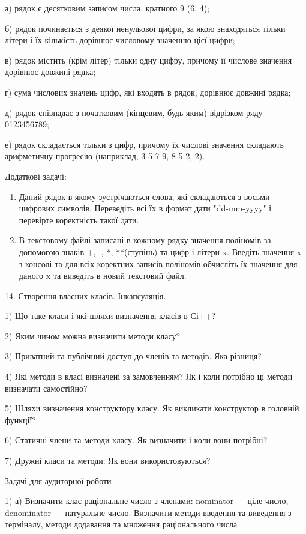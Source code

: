 \documentclass[]{article}
\begin{document}
а) рядок є десятковим записом числа, кратного 9 (6, 4);

б) рядок починається з деякої ненульової цифри, за якою знаходяться
тільки літери і їх кількість дорівнює числовому значенню цієї цифри;

в) рядок містить (крім літер) тільки одну цифру, причому її числове
значення дорівнює довжині рядка;

г) сума числових значень цифр, які входять в рядок, дорівнює довжині
рядка;

д) рядок співпадає з початковим (кінцевим, будь-яким) відрізком ряду
0123456789;

е) рядок складається тільки з цифр, причому їх числові значення
складають арифметичну прогресію (наприклад, 3 5 7 9, 8 5 2, 2).

Додаткові задачі:

\begin{enumerate}
\def\labelenumi{\arabic{enumi})}
\item
  Даний рядок в якому зустрічаються слова, які складаються з восьми
  цифрових символів. Переведіть всі їх в формат дати "dd-mm-yyyy" і
  перевірте коректність такої дати.
\item
  В текстовому файлі записані в кожному рядку значення поліномів за
  допомогою знаків +, -, *, **(ступінь) та цифр і літери x. Введіть
  значення x з консолі та для всіх коректних записів поліномів обчисліть
  їх значення для даного x та виведіть в новий текстовий файл.
\end{enumerate}

14. Створення власних класів. Інкапсуляція.

1) Що таке класи і які шляхи визначення класів в Сі++?

2) Яким чином можна визначити методи класу?

3) Приватний та публічний доступ до членів та методів. Яка різниця?

4) Які методи в класі визначені за замовченням? Як і коли потрібно ці
методи визначати самостійно?

5) Шляхи визначення конструктору класу. Як викликати конструктор в
головній функції?

6) Статичні члени та методи класу. Як визначити і коли вони потрібні?

7) Дружні класи та методи. Як вони використовуються?

Задачі для аудиторної роботи

1) а) Визначити клас раціональне число з членами: nominator --- ціле
число, denominator --- натуральне число. Визначити методи введення та
виведення з терміналу, методи додавання та множення раціонального числа
\end{document}
